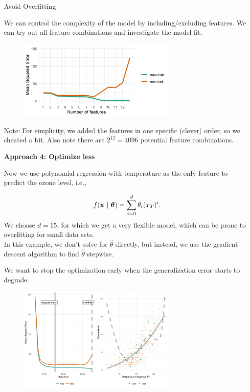 \documentclass[11pt,compress,t,notes=noshow, xcolor=table]{beamer}
\begin{document}
\begin{vbframe}{Avoid Overfitting}
\framebreak 

We can control the complexity of the model by including/excluding features.
We can try out all feature combinations and investigate the model fit.


\begin{figure}
\includegraphics[width=0.7\textwidth]{figure/avoid_overfitting_02.png}\\
\end{figure}

\vfill

\begin{footnotesize}
Note: For simplicity, we added the features in one specific (clever) order, so we cheated a bit. Also note there are $2^{12} = 4096$ potential feature combinations.
\end{footnotesize}

\framebreak

\textbf{Approach 4: Optimize less}

\lz 

Now we use polynomial regression with temperature as the only feature to predict the ozone level, i.e.,

$$f(\mathbf{x} ~|~ \bm{\theta}) = \sum^{d}_{i=0} \theta_i (x_T)^{i} .$$
We choose $d = 15$, for which we get a very flexible model, which can be prone to overfitting for small data sets. \\
\medskip
In this example, we don't solve for $\hat\theta$ directly, but instead, we use the gradient descent algorithm to find $\hat\theta$ stepwise.

\framebreak

We want to stop the optimization early when the generalization error starts to degrade.


\begin{figure}
\includegraphics[width=0.7\textwidth]{figure/early_stopping.png}\\
\end{figure}


\end{vbframe}
\end{document}
